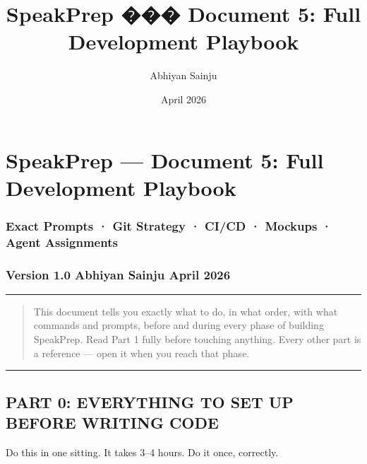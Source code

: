 \documentclass[
  11pt,
]{article}
\title{SpeakPrep ��� Document 5: Full Development Playbook}
\author{Abhiyan Sainju}
\date{April 2026}
\begin{document}
\maketitle

\hypertarget{speakprep-document-5-full-development-playbook}{%
\section{SpeakPrep --- Document 5: Full Development
Playbook}\label{speakprep-document-5-full-development-playbook}}

\hypertarget{exact-prompts-git-strategy-cicd-mockups-agent-assignments}{%
\subsubsection{Exact Prompts · Git Strategy · CI/CD · Mockups · Agent
Assignments}\label{exact-prompts-git-strategy-cicd-mockups-agent-assignments}}

\hypertarget{version-1.0-abhiyan-sainju-april-2026}{%
\subsubsection{Version 1.0 \textbar{} Abhiyan Sainju \textbar{} April
2026}\label{version-1.0-abhiyan-sainju-april-2026}}

\begin{center}\rule{0.5\linewidth}{0.5pt}\end{center}

\begin{quote}
This document tells you exactly what to do, in what order, with what
commands and prompts, before and during every phase of building
SpeakPrep. Read Part 1 fully before touching anything. Every other part
is a reference --- open it when you reach that phase.
\end{quote}

\begin{center}\rule{0.5\linewidth}{0.5pt}\end{center}

\hypertarget{part-0-everything-to-set-up-before-writing-code}{%
\subsection{PART 0: EVERYTHING TO SET UP BEFORE WRITING
CODE}\label{part-0-everything-to-set-up-before-writing-code}}

Do this in one sitting. It takes 3--4 hours. Do it once, correctly.
\end{document}
